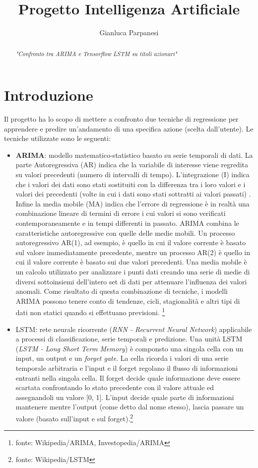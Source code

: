\documentclass[a4paper,12pt]{article}
\title{Progetto Intelligenza Artificiale}
\author{Gianluca Parpanesi}
\begin{document}
    \maketitle
    \begin{abstract}
        \textit{"Confronto tra ARIMA e Tensorflow LSTM su titoli azionari"}
    \end{abstract}
    \newpage
    \section*{Introduzione}Il progetto ha lo scopo di mettere a confronto due 
    tecniche di regressione per apprendere e predire un'andamento di una 
    specifica azione (scelta dall'utente).
    Le tecniche utilizzate sono le seguenti:
    \begin{itemize}
        \item \textbf{ARIMA}: modello matematico-statistico basato su serie 
        temporali di dati. La parte Autoregressiva (AR) indica che la variabile
        di interesse viene regredita su valori precedenti (numero di intervalli
        di tempo). L'integrazione (I) indica che i valori dei dati sono stati 
        sostituiti con la differenza tra i loro valori e i valori dei 
        precedenti (volte in cui i dati sono stati sottratti ai valori passati)
        . Infine la media mobile (MA) indica che l'errore di regressione è in 
        realtà una combinazione lineare di termini di errore i cui valori si 
        sono verificati contemporaneamente e in tempi differenti in passato.
        ARIMA combina le caratteristiche autoregressive con quelle delle medie 
        mobili. Un processo autoregressivo AR(1), ad esempio, è quello in cui il 
        valore corrente è basato sul valore immediatamente precedente, 
        mentre un processo AR(2) è quello in cui il valore corrente è basato 
        sui due valori precedenti. Una media mobile è un calcolo utilizzato per
        analizzare i punti dati creando una serie di medie di diversi 
        sottoinsiemi dell'intero set di dati per attenuare l'influenza dei 
        valori anomali. Come risultato di questa combinazione di tecniche, i 
        modelli ARIMA possono tenere conto di tendenze, cicli, stagionalità e 
        altri tipi di dati non statici quando si effettuano previsioni.
        \footnote[1]{fonte: Wikipedia/ARIMA, Investopedia/ARIMA}
        \item LSTM: rete neurale ricorrente (\textit{RNN - Recurrent Neural 
        Network}) applicabile a processi di classificazione, serie temporali e 
        predizione. Una unità LSTM (\textit{LSTM - Long Short Term Memory}) è 
        componsto una singola cella con un input, un output e un \textit{forget
        gate}. La cella ricorda i valori di una serie temporale arbitraria e 
        l'input e il forget regolano il flusso di informazioni entranti nella
        singola cella. Il forget decide quale informazione deve essere scartata
        confrontando lo stato precedente con il valore attuale ed assegnandoli
        un valore [0, 1]. L'input decide quale parte di informazioni mantenere
        mentre l'output (come detto dal nome stesso), lascia passare un valore
        (basato sull'input e sul forget).\footnote[2]{fonte: Wikipedia/LSTM}


\end{itemize}
\end{document}
